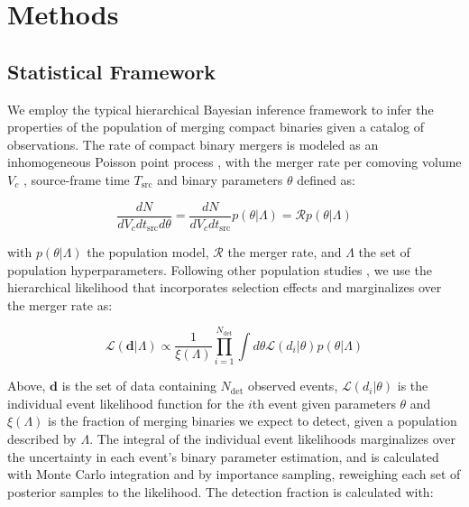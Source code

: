 \section{Methods} \label{sec:methods}

\subsection{Statistical Framework} \label{sec:statistical_framework}

We employ the typical hierarchical Bayesian inference framework to infer the properties of the population of merging compact binaries given a catalog of observations. The rate of compact binary mergers is modeled as an inhomogeneous Poisson point process \citep{10.1093/mnras/stz896}, with the merger rate per comoving volume $V_c$ \citep{astro-ph/9905116}, source-frame time $T_\text{src}$ and binary parameters $\theta$ defined as: 

\begin{equation} \label{eq:rate}
    \frac{dN}{dV_cdt_\mathrm{src}d\theta} = \frac{dN}{dV_cdt_\mathrm{src}} p(\theta | \Lambda) = \mathcal{R} p(\theta | \Lambda)
\end{equation}

\noindent with $p(\theta | \Lambda)$ the population model, $\mathcal{R}$ the merger rate, and $\Lambda$ the set of population hyperparameters. Following other population studies \citep{10.1093/mnras/stz896,2007.05579,2021ApJ...913L...7A,2111.03634}, we use the hierarchical likelihood that incorporates selection effects and marginalizes over the merger rate as: 

\begin{equation} \label{eq:likelihood}
    \mathcal{L}(\bm{d} | \Lambda) \propto \frac{1}{\xi(\Lambda)} \prod_{i=1}^{N_\mathrm{det}} \int d\theta \mathcal{L}(d_i | \theta) p(\theta | \Lambda)
\end{equation}

\noindent Above, $\bm{d}$ is the set of data containing $N_\mathrm{det}$ observed events, $\mathcal{L}(d_i | \theta)$ is the individual event likelihood function for the $i$th event given parameters $\theta$ and $\xi(\Lambda)$ is the fraction of merging binaries we expect to detect, given a population described by $\Lambda$. The integral of the individual event likelihoods marginalizes over the uncertainty in each event's binary parameter estimation, and is calculated with Monte Carlo integration and by importance sampling, reweighing each set of posterior samples to the likelihood. The detection fraction is calculated with:

